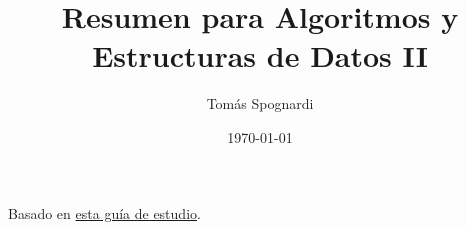 \documentclass{article}
\title{Resumen para Algoritmos y Estructuras de Datos II}
\author{Tomás Spognardi}
\date{\today}
\begin{document}
    
    \maketitle

    Basado en \href{https://campus.exactas.uba.ar/pluginfile.php/390238/mod_resource/content/1/resumen.pdf}{esta guía de estudio}.

    \tableofcontents

    
\end{document}
